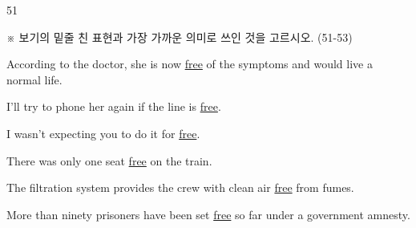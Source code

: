 \begin{question}{51}
\begin{framedtext}
※ 보기의 밑줄 친 표현과 가장 가까운 의미로 쓰인 것을 고르시오. (51-53) \par
\end{framedtext}
According to the doctor, she is now \uline{free} of the symptoms and would live a normal life.
\begin{choices}
  \item I'll try to phone her again if the line is \uline{free}.
  \item I wasn't expecting you to do it for \uline{free}.
  \item There was only one seat \uline{free} on the train.
  \item The filtration system provides the crew with clean air \uline{free} from fumes.
  \item More than ninety prisoners have been set \uline{free} so far under a government amnesty.
\end{choices}
\end{question}
